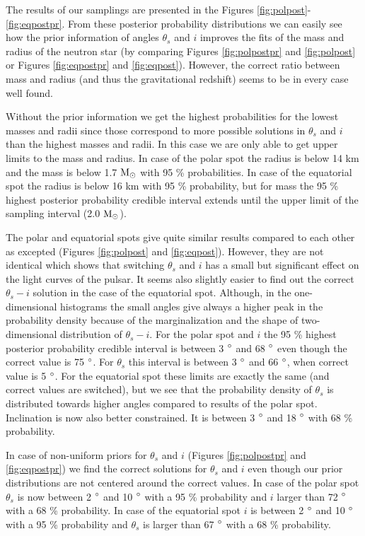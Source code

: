\documentclass{wihuri}
\def\msun{{\rm M_{\odot}}}
\def\thetas{\theta_{s}}
\begin{document}
The results of our samplings are presented in the Figures \ref{fig:polpost}-\ref{fig:eqpostpr}. From these posterior probability distributions we can easily see how the prior information of angles $\thetas$ and $i$ improves the fits of the mass and radius of the neutron star (by comparing Figures \ref{fig:polpostpr} and \ref{fig:polpost} or Figures \ref{fig:eqpostpr} and \ref{fig:eqpost}). However, the correct ratio between mass and radius (and thus the gravitational redshift) seems to be in every case well found.

Without the prior information we get the highest probabilities for the lowest masses and radii since those correspond to more possible solutions in  $\thetas$ and $i$ than the highest masses and radii. In this case we are only able to get upper limits to the mass and radius. In case of the polar spot the radius is below 14 km and the mass is below 1.7 $\msun$ with 95 \% probabilities. In case of the equatorial spot the radius is below 16 km  with 95 \% probability, but for mass the 95 \% highest posterior probability credible interval extends until the upper limit of the sampling interval (2.0 $\msun$).

The polar and equatorial spots give quite similar results compared to each other as excepted (Figures \ref{fig:polpost} and \ref{fig:eqpost}). However, they are not identical which shows that switching $\thetas$ and $i$ has a small but significant effect on the light curves of the pulsar. It seems also slightly easier to find out the correct $\thetas-i$ solution  in the case of the equatorial spot. Although, in the one-dimensional histograms the small angles give always a higher peak in the probability density because of the marginalization and the shape of two-dimensional distribution of $\thetas-i$. For the polar spot and $i$ the 95 \% highest posterior probability credible interval is between 3 $\degree$ and 68 $\degree$ even though the correct value is 75 $\degree$. For $\thetas$ this interval is between 3 $\degree$ and 66 $\degree$, when correct value is 5 $\degree$. For the equatorial spot these limits are exactly the same (and correct values are switched), but we see that the probability density of $\thetas$ is distributed towards higher angles compared to results of the polar spot. Inclination is now also better constrained. It is between 3 $\degree$ and 18 $\degree$ with 68 \% probability.

In case of non-uniform priors for $\thetas$ and $i$ (Figures \ref{fig:polpostpr} and \ref{fig:eqpostpr}) we find the correct solutions for $\thetas$ and $i$ even though our prior distributions are not centered  around the correct values. In case of the polar spot $\thetas$ is now between 2 $\degree$ and 10 $\degree$ with a 95 \% probability and $i$ larger than 72 $\degree$ with a 68 \% probability. In case of the equatorial spot $i$ is between 2 $\degree$ and 10 $\degree$ with a 95 \% probability and $\thetas$ is larger than 67 $\degree$ with a 68 \% probability.
\end{document}
